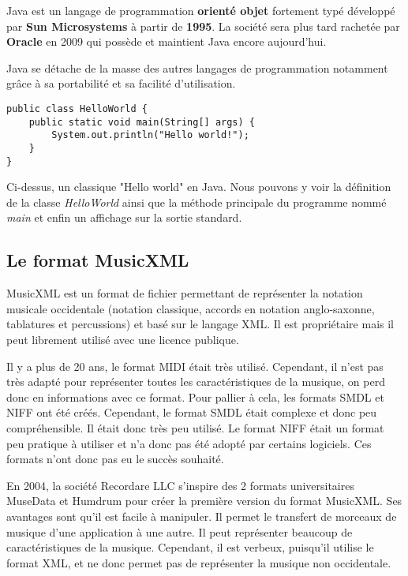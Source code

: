 \par 
Java est un langage de programmation \textbf{orienté objet} fortement typé développé par \textbf{Sun Microsystems} à partir de \textbf{1995}. La société sera plus tard rachetée par \textbf{Oracle} en 2009 qui possède et maintient Java encore aujourd'hui.

\par 
Java se détache de la masse des autres langages de programmation notamment grâce à sa portabilité et sa facilité d'utilisation.

\begin{lstlisting}[caption=Hello world en java]
public class HelloWorld {
    public static void main(String[] args) {
        System.out.println("Hello world!");
    }
}
\end{lstlisting}

\par
Ci-dessus, un classique "Hello world" en Java. Nous pouvons y voir la définition de la classe \emph{HelloWorld} ainsi que la méthode principale du programme nommé \emph{main} et enfin un affichage sur la sortie standard.



\subsection{Le format MusicXML}

MusicXML \cite{musicxml} est un format de fichier permettant de représenter la notation musicale occidentale (notation classique, accords en notation anglo-saxonne, tablatures et percussions) et basé sur le langage XML. Il est propriétaire mais il peut librement utilisé avec une licence publique.

\par
Il y a plus de 20 ans, le format MIDI était très utilisé. Cependant, il n’est pas très adapté pour représenter toutes les caractéristiques de la musique, on perd donc en informations avec ce format. Pour pallier à cela, les formats SMDL et NIFF ont été créés. Cependant, le format SMDL était complexe et donc peu compréhensible. Il était donc très peu utilisé. Le format NIFF était un format peu pratique à utiliser et n’a donc pas été adopté par certains logiciels. Ces formats n’ont donc pas eu le succès souhaité.

\par
En 2004, la société Recordare LLC s’inspire des 2 formats universitaires MuseData et Humdrum pour créer la première version du format MusicXML. Ses avantages sont qu’il est facile à manipuler. Il permet le transfert de morceaux de musique d’une application à une autre. Il peut représenter beaucoup de caractéristiques de la musique. Cependant, il est verbeux, puisqu'il utilise le format XML, et ne donc permet pas de représenter la musique non occidentale.

